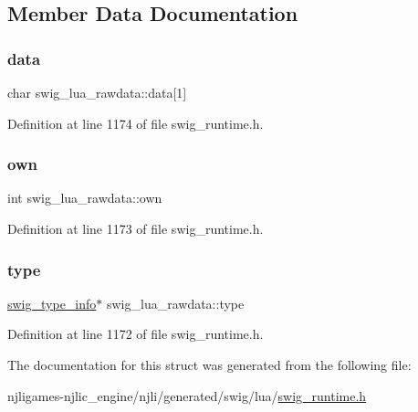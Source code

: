 \subsection{Member Data Documentation}
\mbox{\label{structswig__lua__rawdata_acbba29d10dcd1b96ba3b8d255b777749}} 
\subsubsection{\texorpdfstring{data}{data}}
{\footnotesize\ttfamily char swig\+\_\+lua\+\_\+rawdata\+::data\mbox{[}1\mbox{]}}



Definition at line 1174 of file swig\+\_\+runtime.\+h.

\mbox{\label{structswig__lua__rawdata_ac52566bcb4a7b4d8421c17d182048924}} 
\subsubsection{\texorpdfstring{own}{own}}
{\footnotesize\ttfamily int swig\+\_\+lua\+\_\+rawdata\+::own}



Definition at line 1173 of file swig\+\_\+runtime.\+h.

\mbox{\label{structswig__lua__rawdata_a935edef9803f54e65acaa0ecf8c81ed2}} 
\subsubsection{\texorpdfstring{type}{type}}
{\footnotesize\ttfamily \mbox{\hyperlink{structswig__type__info}{swig\+\_\+type\+\_\+info}}$\ast$ swig\+\_\+lua\+\_\+rawdata\+::type}



Definition at line 1172 of file swig\+\_\+runtime.\+h.



The documentation for this struct was generated from the following file\+:\begin{DoxyCompactItemize}
\item 
njligames-\/njlic\+\_\+engine/njli/generated/swig/lua/\mbox{\hyperlink{swig__runtime_8h}{swig\+\_\+runtime.\+h}}\end{DoxyCompactItemize}
